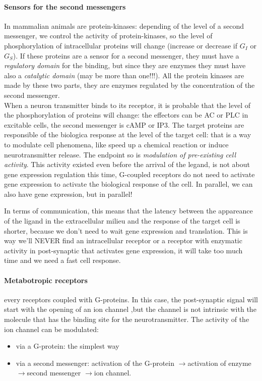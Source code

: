 \documentclass[a4paper, 12pt]{book}
\newcommand{\lfreccia}{\ensuremath{\longrightarrow}}
\begin{document}
\paragraph{Sensors for the second messengers}
In mammalian animals are protein-kinases: depending of the level of a second messenger, we control the activity of protein-kinases, so the level of phosphorylation of intracellular proteins will change (increase or decrease if $G_I$ or $G_S$). If these proteins are a sensor for a second messenger, they must have a \emph{regulatory domain} for the binding, but since they are enzymes they must have also a \emph{catalytic domain} (may be more than one!!!). All the protein kinases are made by these two parts, they are enzymes regulated by the concentration of the second messenger.
\\

When a neuron transmitter binds to its receptor, it is probable that the level of the phosphorylation of proteins will change: the effectors can be AC or PLC in excitable cells, the second messenger is cAMP or IP3. The target proteins are responsible of the biologica response at the level of the target cell: that is a way to modulate cell phenomena, like speed up a chemical reaction or induce neurotransmitter release. The endpoint so is \emph{modulation of pre-existing cell activity}. This activity existed even before the arrival of the legand, is not about gene expression regulation this time, G-coupled receptors do not need to activate gene expression to activate the biological response of the cell. In parallel, we can also have gene expression, but in parallel!

In terms of communication, this means that the latency between the appareance of the ligand in the extracellular milieu and the response of the target cell is shorter, because we don't need to wait gene expression and translation. This is way we'll NEVER find an intracellular receptor or a receptor with enzymatic activity in post-synaptic that activates gene expression, it will take too much time and we need a fast cell response.

\paragraph{Metabotropic receptors} every receptors coupled with G-proteins. In this case, the post-synaptic signal will start with the opening of an ion channel ,but the channel is not intrinsic with the molecule that has the binding site for the neurotransmitter. The activity of the ion channel can be modulated:
\begin{itemize} 
\item{via a G-protein: the simplest way}
\item{via a second messenger: activation of the G-protein \lfreccia activation of enzyme \lfreccia second messenger \lfreccia ion channel.}
\end{itemize}
\end{document}
